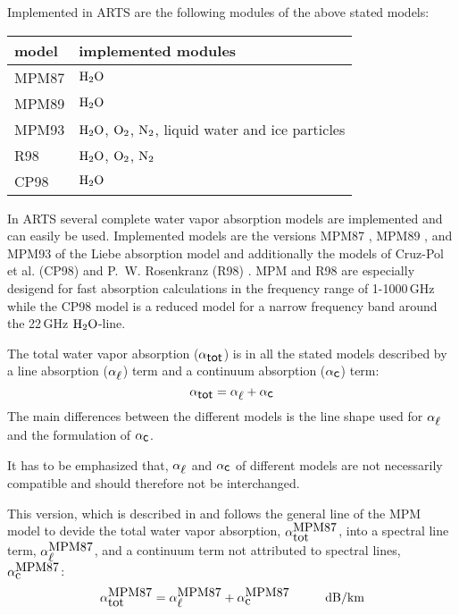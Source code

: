{Implemented in ARTS are the following modules of the above stated models:
%
\begin{center}
\begin{tabular}{ll}
\hline
model & implemented modules \\
\hline
MPM87 & $\mbox{H}_2\mbox{O}$ \\
MPM89 & $\mbox{H}_2\mbox{O}$ \\
MPM93 & $\mbox{H}_2\mbox{O}$, $\mbox{O}_2$, $\mbox{N}_2$, liquid water and ice particles \\
R98   & $\mbox{H}_2\mbox{O}$, $\mbox{O}_2$, $\mbox{N}_2$ \\
CP98  & $\mbox{H}_2\mbox{O}$ \\
\hline
\end{tabular}
\end{center}




\label{levelc:CompWatVapMod}
In ARTS several complete water vapor absorption models are implemented and 
can easily be used.
Implemented models are the versions MPM87 \cite{liebeandlayton:87}, MPM89 
\cite{liebe:89}, and MPM93 \cite{liebeetal:93} of the Liebe absorption 
model and additionally the models of Cruz-Pol et al. (CP98) \cite{cruzpol:98} 
and P.~W. Rosenkranz (R98) \cite{pwr:98}. 
MPM and R98 are especially desigend for fast absorption calculations in 
the frequency range of 1-1000\,GHz while the CP98 model is a reduced model 
for a narrow frequency band around the 22\,GHz $\mbox{H}_2\mbox{O}$-line.

The total water vapor absorption ($\alpha_{\mbox{\sf tot}}$) is in all the stated models 
described by a line absorption ($\alpha_{\mbox{$\ell$}}$) term and a continuum absorption 
($\alpha_{\mbox{\sf c}}$) term: 
\begin{equation}
  \label{eq:h2o:totabs}
  \alpha_{\mbox{\sf tot}} = \alpha_{\mbox{$\ell$}} + \alpha_{\mbox{\sf c}}
\end{equation}
The main differences between the different models is the line shape used for 
$\alpha_{\mbox{$\ell$}}$ and the formulation of $\alpha_{\mbox{\sf c}}$.

It has to be emphasized that, $\alpha_{\mbox{$\ell$}}$ and $\alpha_{\mbox{\sf c}}$ of different
models are not necessarily compatible and should therefore not be interchanged.


\label{leveld:mpm87}
This version, which is described in \cite{liebeandlayton:87} and 
follows the general line of the MPM model to devide the total water vapor absorption, 
$\alpha^{\mbox{\rm MPM87}}_{\mbox{tot}}$, into a spectral line term, $\alpha^{\mbox{\rm MPM87}}_{\mbox{$\ell$}}$, and a 
continuum term not attributed to spectral lines, $\alpha^{\mbox{\rm MPM87}}_{\mbox{c}}$:
\begin{equation}
  \label{eq:mpm87_abs}
  \alphampmotot = \alphampmol + \alphampmoc\hspace*{10mm}\mbox{dB/km}
\end{equation}



}
